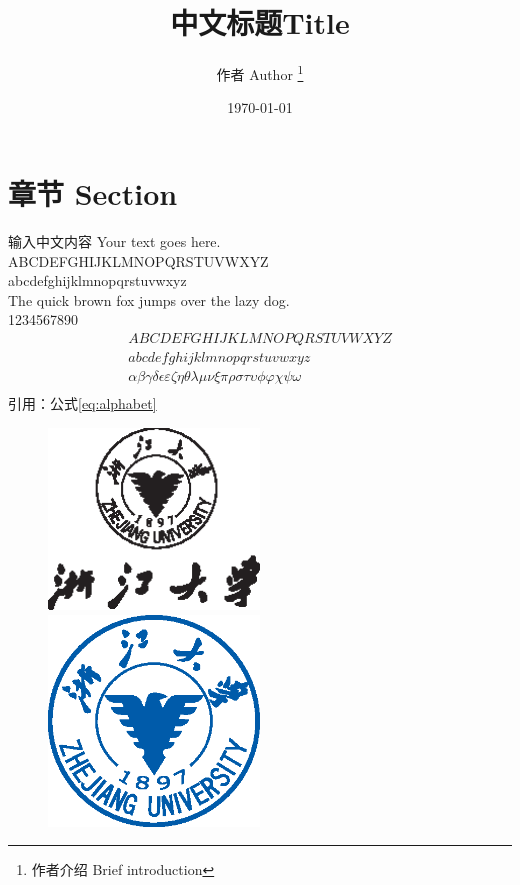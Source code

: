 \documentclass[UTF8,a4paper,10pt]{ctexart}
\title{中文标题Title}
\author{ 作者 Author \thanks{作者介绍 Brief introduction} }
\date{\today}
\begin{document}
	\maketitle
	\thispagestyle{fancy}
	
\section{章节 Section}
	输入中文内容 Your text goes here. \\
	ABCDEFGHIJKLMNOPQRSTUVWXYZ \\
	abcdefghijklmnopqrstuvwxyz \\
	The quick brown fox jumps over the lazy dog.\\
	1234567890
	\begin{align}
		ABCDEFGHIJKLMNOPQRSTUVWXYZ \label{eq:alphabet} \\
		abcdefghijklmnopqrstuvwxyz \\
	\alpha \beta \gamma \delta \epsilon \varepsilon \zeta \eta \theta \lambda \mu \nu \xi \pi \rho \sigma \tau \upsilon \phi \varphi \chi \psi \omega  \\
	\end{align}
	引用：公式\eqref{eq:alphabet}
	\begin{figure}[htbp]
		\centering
		\includegraphics[width=0.5\textwidth]{fig/ZJU_BLACK.eps}
		\includegraphics[width=0.5\textwidth]{fig/ZJU_BLUE.eps}
	\end{figure}
\end{document}
